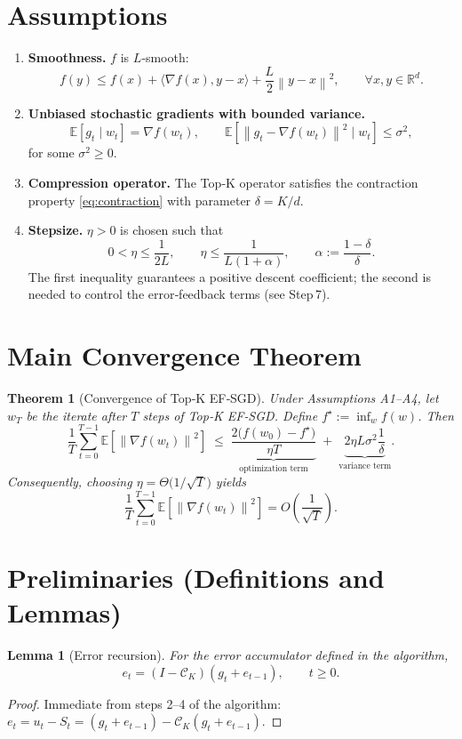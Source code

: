 \documentclass{article}
\newtheorem{lemma}{Lemma}
\newtheorem{theorem}{Theorem}
\newcommand{\E}{\mathbb{E}}
\newcommand{\R}{\mathbb{R}}
\newcommand{\norm}[1]{\left\lVert#1\right\rVert}
\begin{document}
\section*{Assumptions}
\begin{enumerate}[label=\textbf{A\arabic*:},leftmargin=*]
\item \textbf{Smoothness.}  $f$ is $L$‑smooth:
\[
f(y)\le f(x)+\langle\nabla f(x),y-x\rangle+\frac{L}{2}\norm{y-x}^{2},
\qquad\forall x,y\in\R^{d}.
\tag{A1}
\]
\item \textbf{Unbiased stochastic gradients with bounded variance.}
\[
\E\!\left[g_t\mid w_t\right]=\nabla f(w_t),\qquad
\E\!\left[\norm{g_t-\nabla f(w_t)}^{2}\mid w_t\right]\le\sigma^{2},
\tag{A2}
\]
for some $\sigma^{2}\ge0$.
\item \textbf{Compression operator.}  The Top‑K operator satisfies the
contraction property \eqref{eq:contraction} with parameter
$\delta=K/d$.
\item \textbf{Stepsize.}  $\eta>0$ is chosen such that
\begin{equation}
0<\eta\le\frac{1}{2L},
\qquad
\eta\le\frac{1}{L(1+\alpha)},
\qquad
\alpha:=\frac{1-\delta}{\delta}.
\tag{A4}
\end{equation}
The first inequality guarantees a positive descent coefficient; the second
is needed to control the error‑feedback terms (see Step 7).
\end{enumerate}

\section*{Main Convergence Theorem}
\begin{theorem}[Convergence of Top‑K EF‑SGD]\label{thm:main}
Under Assumptions A1–A4, let $w_T$ be the iterate after $T$ steps of
Top‑K EF‑SGD.  Define $f^\star:=\inf_{w}f(w)$.  Then
\[
\frac{1}{T}\sum_{t=0}^{T-1}\E\!\left[\norm{\nabla f(w_t)}^{2}\right]
\;\le\;
\underbrace{\frac{2\bigl(f(w_0)-f^\star\bigr)}{\eta T}}_{\displaystyle\text{optimization term}}
\;+\;
\underbrace{2\eta L\sigma^{2}\frac{1}{\delta}}_{\displaystyle\text{variance term}} .
\tag{T1}
\]
Consequently, choosing $\eta =\Theta\!\bigl(1/\sqrt{T}\bigr)$ yields
\[
\frac{1}{T}\sum_{t=0}^{T-1}\E\!\left[\norm{\nabla f(w_t)}^{2}\right]
= O\!\left(\frac{1}{\sqrt{T}}\right).
\]
\end{theorem}

\section*{Preliminaries (Definitions and Lemmas)}
\begin{lemma}[Error recursion]\label{lem:error}
For the error accumulator defined in the algorithm,
\[
e_t = (I-\mathcal{C}_{K})(g_t+e_{t-1}),\qquad t\ge0.
\]
\end{lemma}
\begin{proof}
Immediate from steps 2–4 of the algorithm:
$e_t = u_t - S_t = (g_t+e_{t-1}) - \mathcal{C}_{K}(g_t+e_{t-1})$.
\end{proof}
\end{document}
